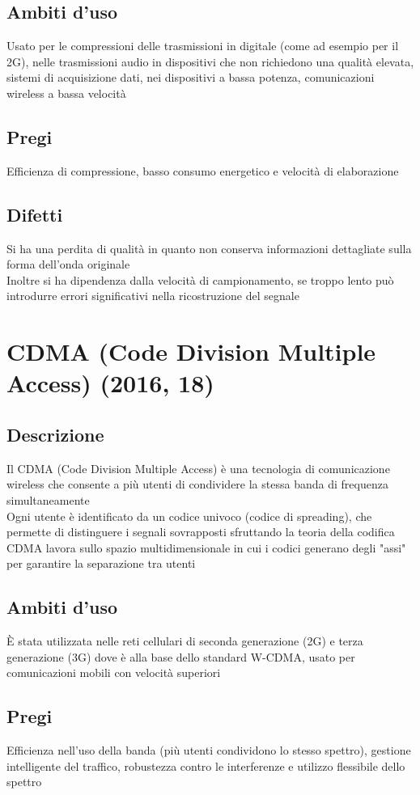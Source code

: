 \documentclass[10pt,oneside,a4paper]{article}
\begin{document}
\subsection{Ambiti d'uso}
Usato per le compressioni delle trasmissioni in digitale (come ad esempio per il 2G), nelle trasmissioni audio in dispositivi che non richiedono una qualità elevata, sistemi di acquisizione dati, nei dispositivi a bassa potenza, comunicazioni wireless a bassa velocità
\subsection{Pregi}
Efficienza di compressione, basso consumo energetico e velocità di elaborazione
\subsection{Difetti}
Si ha una perdita di qualità in quanto non conserva informazioni dettagliate sulla forma dell'onda originale\\
Inoltre si ha dipendenza dalla velocità di campionamento, se troppo lento può introdurre errori significativi nella ricostruzione del segnale
\section{CDMA (Code Division Multiple Access) (2016, 18)}
\subsection{Descrizione}
Il CDMA (Code Division Multiple Access) è una tecnologia di comunicazione wireless che consente a più utenti di condividere la stessa banda di frequenza simultaneamente\\
Ogni utente è identificato da un codice univoco (codice di spreading), che permette di distinguere i segnali sovrapposti sfruttando la teoria della codifica\\
CDMA lavora sullo spazio multidimensionale in cui i codici generano degli "assi" per garantire la separazione tra utenti
\subsection{Ambiti d'uso}
È stata utilizzata nelle reti cellulari di seconda generazione (2G) e terza generazione (3G) dove è alla base dello standard W-CDMA, usato per comunicazioni mobili con velocità superiori
\subsection{Pregi}
Efficienza nell'uso della banda (più utenti condividono lo stesso spettro), gestione intelligente del traffico, robustezza contro le interferenze e utilizzo flessibile dello spettro
\end{document}
